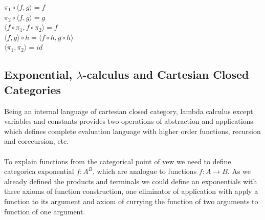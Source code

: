 \documentclass[11pt,oneside]{article}
\begin{document}
\begin{prooftree}
\end{prooftree}

\begin{center}
$\pi_1 \circ \langle f, g \rangle = f$\\
$\pi_2 \circ \langle f, g \rangle = g$\\
$\langle f \circ \pi_1, f \circ \pi_2 \rangle = f$\\
$\langle f, g \rangle \circ h = \langle f \circ h, g \circ h \rangle$\\
$\langle \pi_1, \pi_2 \rangle = id$\\
\end{center}

\newpage
   \subsection{Exponential, $\lambda$-calculus and Cartesian Closed Categories}
   Being an internal language of cartesian closed category, lambda calculus except variables and constants
   provides two operations of abstraction and applications which defines complete evaluation language
   with higher order functions, recursion and corecursion, etc.

   \paragraph{}
   To explain functions from the categorical point of vew we need to define categorica exponential
   $f: A^B$, which are analogue to functions $f: A \rightarrow B$.
   As we already defined the products and terminals we could define an exponentials with three
   axioms of function construction, one eliminator of application with apply a function to its argument
   and axiom of currying the function of two arguments to function of one argument.
\end{document}
